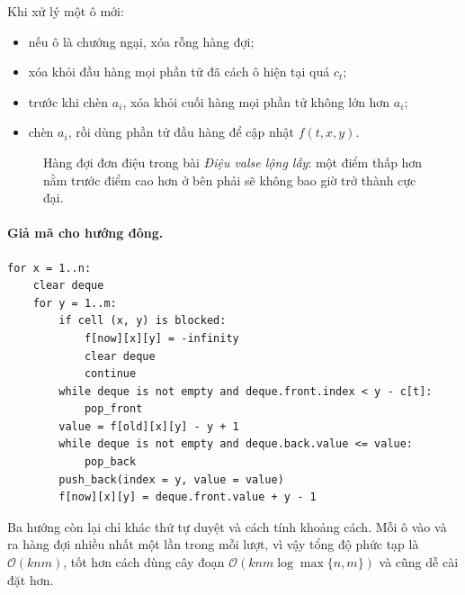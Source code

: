 \documentclass[11pt]{article}
\newcommand{\Oh}{\mathcal{O}}
\begin{document}
Khi xử lý một ô mới:
\begin{itemize}
  \item nếu ô là chướng ngại, xóa rỗng hàng đợi;
  \item xóa khỏi đầu hàng mọi phần tử đã cách ô hiện tại quá \(c_t\);
  \item trước khi chèn \(a_i\), xóa khỏi cuối hàng mọi phần tử không lớn hơn
  \(a_i\);
  \item chèn \(a_i\), rồi dùng phần tử đầu hàng để cập nhật \(f(t,x,y)\).
\end{itemize}

\begin{figure}[ht]
\centering
{}
\caption{Hàng đợi đơn điệu trong bài \textit{Điệu valse lộng lẫy}: một điểm
thấp hơn nằm trước điểm cao hơn ở bên phải sẽ không bao giờ trở thành cực đại.}
\end{figure}

\paragraph{Giả mã cho hướng đông.}
\begin{verbatim}
for x = 1..n:
    clear deque
    for y = 1..m:
        if cell (x, y) is blocked:
            f[now][x][y] = -infinity
            clear deque
            continue
        while deque is not empty and deque.front.index < y - c[t]:
            pop_front
        value = f[old][x][y] - y + 1
        while deque is not empty and deque.back.value <= value:
            pop_back
        push_back(index = y, value = value)
        f[now][x][y] = deque.front.value + y - 1
\end{verbatim}
Ba hướng còn lại chỉ khác thứ tự duyệt và cách tính khoảng cách. Mỗi ô vào và
ra hàng đợi nhiều nhất một lần trong mỗi lượt, vì vậy tổng độ phức tạp là
\(\Oh(knm)\), tốt hơn cách dùng cây đoạn \(\Oh(knm\log\max\{n,m\})\) và cũng
dễ cài đặt hơn.
\end{document}

